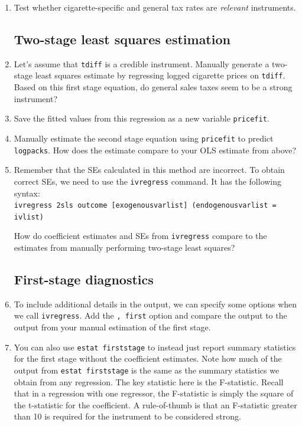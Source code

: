 \documentclass[a4paper,12pt]{article}
\begin{document}
\begin{enumerate}
\item Test whether cigarette-specific and general tax rates are {\em relevant} instruments.

\subsection*{Two-stage least squares estimation}

\item Let's assume that \texttt{tdiff} is a credible instrument. Manually generate a two-stage least squares estimate by regressing logged cigarette prices on \texttt{tdiff}. Based on this first stage equation, do general sales taxes seem to be a strong instrument?

\item Save the fitted values from this regression as a new variable \texttt{pricefit}.

\item Manually estimate the second stage equation using \texttt{pricefit} to predict \texttt{logpacks}. How does the estimate compare to your OLS estimate from above?

\item Remember that the SEs calculated in this method are incorrect. To obtain correct SEs, we need to use the \texttt{ivregress} command. It has the following syntax:\\
\texttt{ivregress 2sls outcome [exogenousvarlist] (endogenousvarlist = ivlist)}

How do coefficient estimates and SEs from \texttt{ivregress} compare to the estimates from manually performing two-stage least squares?

\subsection*{First-stage diagnostics}

\item To include additional details in the output, we can specify some options when we call \texttt{ivregress}. Add the \texttt{, first} option and compare the output to the output from your manual estimation of the first stage.

\item You can also use \texttt{estat firststage} to instead just report summary statistics for the first stage without the coefficient estimates. Note how much of the output from \texttt{estat firststage} is the same as the summary statistics we obtain from any regression. The key statistic here is the F-statistic. Recall that in a regression with one regressor, the F-statistic is simply the square of the t-statistic for the coefficient. A rule-of-thumb is that an F-statistic greater than 10 is required for the instrument to be considered strong.


\end{enumerate}
\end{document}
